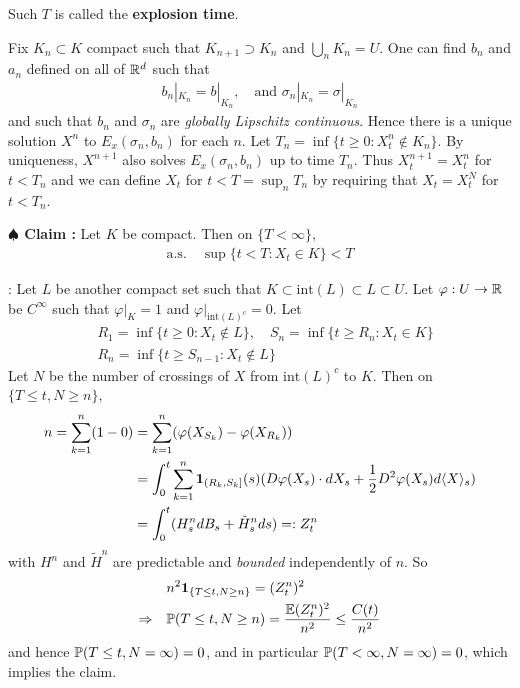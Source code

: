 \documentclass[12pt,a4paper]{article}
\newenvironment{proof}
{\begin{changemargin}{0.5cm}{0.5cm} 
	}%
	{\end{changemargin}
}
\newenvironment{subproof}
{\begin{changemargin}{0.5cm}{0.5cm} 
	}%
	{\end{changemargin}
}
\newenvironment{p}
{\begin{proof} 
	}%
	{\end{proof}
}
\begin{document}
\quad Such $T$ is called the \textbf{explosion time}.
\begin{p}
\pf Fix $K_n \subset K$ compact such that $K_{n+1} \supset K_n$ and $\bigcup_{n} K_n = U$. One can find $b_n$ and $a_n$ defined on all of $\mathbb{R}^d$ such that
\begin{align*}
b_n|_{K_n} = b|_{K_n}, \quad \text{and } \sigma_n |_{K_n} = \sigma|_{K_n}
\end{align*}
and such that $b_n$ and $\sigma_n$ are \emph{globally Lipschitz continuous}. Hence there is a unique solution $X^n$ to $E_x(\sigma_n, b_n)$ for each $n$. Let $T_n = \inf\{t\geq 0 : X_t^n \not\in K_n \}$.  By uniqueness, $X^{n+1}$ also solves $E_x(\sigma_n, b_n)$ up to time $T_n$. Thus $X_t^{n+1} = X_t^n$ for $t< T_n$ and we can define $X_t$ for $t< T = \sup_n T_n$ by requiring that $X_t = X_t^N$ for $t< T_n$.

\textbf{$\spadesuit$ Claim :} Let $K$ be compact. Then on $\{T<\infty\}$,
\begin{align*}
\text{a.s.} \quad \sup \{t< T : X_t \in K \} < T
\end{align*}
\begin{subproof}
: Let $L$ be another compact set such that $K \subset \text{int}(L) \subset L \subset U$. Let $\varphi : U \rightarrow \mathbb{R}$ be $C^{\infty}$ such that $\varphi|_K =1$ and $\varphi|_{\text{int}(L)^c} =0$. Let
\begin{align*}
&R_1 = \inf\{t\geq 0 : X_t \not\in L\} , \quad S_n = \inf\{t\geq R_n : X_t\in K\} \\
&R_n = \inf\{t\geq S_{n-1} : X_t \not\in L \}
\end{align*}
Let $N$ be the number of crossings of $X$ from $\text{int}(L)^c$ to $K$. Then on $\{T \leq t, N\geq n\}$,
\begin{align*}
n = \sum_{k=1}^n (1-0) &= \sum_{k=1}^n (\varphi(X_{S_k}) - \varphi(X_{R_k})) \\
&= \int_0^t \sum_{k=1}^n \bm{1}_{(R_k, S_k]}(s) (D\varphi(X_s) \cdot dX_s + \frac{1}{2} D^2 \varphi(X_s) d\langle X \rangle_s ) \\
&= \int_0^t (H_s^n dB_s + \tilde{H}_s^n ds ) =: Z_t^n
\end{align*}
with $H^n$ and $\tilde{H}^n$ are predictable and \emph{bounded} independently of $n$. So
\begin{align*}
& n^2 \bm{1}_{\{T\leq t, N\geq n\}} = (Z_t^n)^2\\
\Rightarrow \quad & \mathbb{P} (T\leq t , N\geq n) = \frac{\mathbb{E} (Z_t^n)^2}{n^2} \leq \frac{C(t)}{n^2}
\end{align*}
and hence $\mathbb{P}(T\leq t, N= \infty) =0$, and in particular $\mathbb{P} (T< \infty, N= \infty )=0$, which implies the claim.
\end{subproof}
\eop
\end{p}
\s
\end{document}
